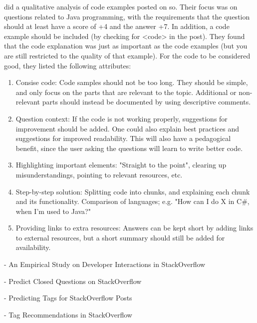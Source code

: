 \citet{Nasehi2012} did a qualitative analysis of code examples posted on \gls{so}. 
Their focus was on questions related to Java programming, with the requirements that the question should at least have a score of +4 and the answer +7. 
In addition, a code example should be included (by checking for <code> in the post).
They found that the code explanation was just as important as the code examples (but you are still restricted to the quality of that example).
For the code to be considered good, they listed the following attributes: 
\begin{enumerate}
	\item Consise code: Code samples should not be too long. 
	They should be simple, and only focus on the parts that are relevant to the topic.
	Additional or non-relevant parts should instead be documented by using descriptive comments.
	\item Question context: 
	If the code is not working properly, suggestions for improvement should be added. 
	One could also explain best practices and suggestions for improved readability.
	This will also have a pedagogical benefit, since the user asking the questions will learn to write better code.
	\item Highlighting important elements: 
	"Straight to the point", clearing up misunderstandings, pointing to relevant resources, etc.
	\item Step-by-step solution: 
	Splitting code into chunks, and explaining each chunk and its functionality.
	Comparison of languages; e.g. "How can I do X in C\#, when I'm used to Java?"
	\item Providing links to extra resources: 
	Answers can be kept short by adding links to external resources, but a short summary should still be added for availability.
\end{enumerate}





\citet{Wang2013} - An Empirical Study on Developer Interactions in StackOverflow

\citet{Lezina2013} - Predict Closed Questions on StackOverflow

\citet{Stanley2013} - Predicting Tags for StackOverflow Posts

\citet{Short2014} - Tag Recommendations in StackOverflow




